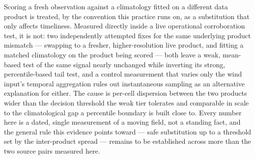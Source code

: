 Scoring a fresh observation against a climatology fitted on a different data
product is treated, by the convention this practice runs on, as a
substitution that only affects timeliness. Measured directly inside a live
operational corroboration test, it is not: two independently attempted
fixes for the same underlying product mismatch --- swapping to a fresher,
higher-resolution live product, and fitting a matched climatology on the
product being scored --- both leave a weak, mean-based test of the same
signal nearly unchanged while inverting its strong, percentile-based tail
test, and a control measurement that varies only the wind input's temporal
aggregation rules out instantaneous sampling as an alternative explanation
for either. The cause is per-cell dispersion between the two products wider
than the decision threshold the weak tier tolerates and comparable in scale
to the climatological gap a percentile boundary is built close to. Every
number here is a dated, single measurement of a moving field, not a standing
fact, and the general rule this evidence points toward --- safe substitution
up to a threshold set by the inter-product spread --- remains to be
established across more than the two source pairs measured here.
